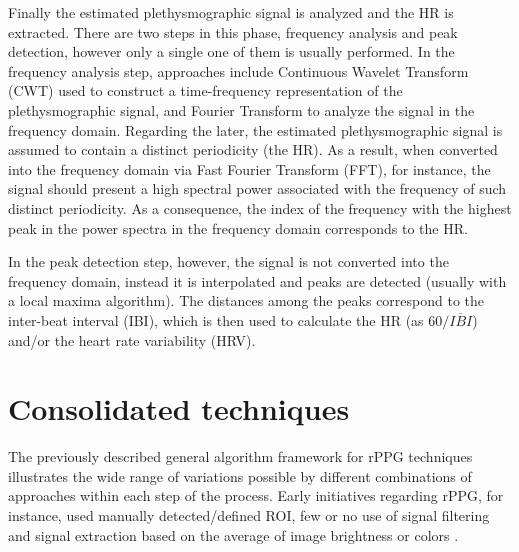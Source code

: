Finally the estimated plethysmographic signal is analyzed and the HR is extracted. There are two steps in this phase, frequency analysis and peak detection, however only a single one of them is usually performed. In the frequency analysis step, approaches include Continuous Wavelet Transform (CWT) used to construct a time-frequency representation of the plethysmographic signal, and Fourier Transform to analyze the signal in the frequency domain. Regarding the later, the estimated plethysmographic signal is assumed to contain a distinct periodicity (the HR). As a result, when converted into the frequency domain via Fast Fourier Transform (FFT), for instance, the signal should present a high spectral power associated with the frequency of such distinct periodicity. As a consequence, the index of the frequency with the highest peak in the power spectra in the frequency domain corresponds to the HR.

In the peak detection step, however, the signal is not converted into the frequency domain, instead it is interpolated and peaks are detected (usually with a local maxima algorithm). The distances among the peaks correspond to the inter-beat interval (IBI), which is then used to calculate the HR (as $60/\overline{IBI}$) and/or the heart rate variability (HRV).

\section{Consolidated techniques}
\label{s:literature-rppg-techniques}

The previously described general algorithm framework for rPPG techniques illustrates the wide range of variations possible by different combinations of approaches within each step of the process. Early initiatives regarding rPPG, for instance, used manually detected/defined ROI, few or no use of signal filtering and signal extraction based on the average of image brightness \parencite{takano2007heart} or colors \parencite{verkruysse2008remote}.

